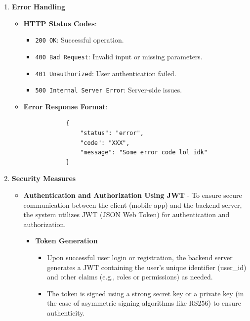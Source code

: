 \documentclass[12pt, titlepage]{article}
\begin{document}
\begin{enumerate}
\begin{itemize}
\begin{itemize}
\begin{verbatim}
				{
					"userId": "12345",
					"budget": {
						"Groceries": 200,
						"Entertainment": 100
					}
				}
			\end{verbatim}
			\item \textbf{Response}:
			\begin{verbatim}
				{
					"status": "success",
					"message": "Budget updated successfully."
				}
			\end{verbatim}
		\end{itemize}
	\end{itemize}
	\item \textbf{Error Handling}
	\begin{itemize}
		\item \textbf{HTTP Status Codes}:
		\begin{itemize}
			\item \texttt{200 OK}: Successful operation.
			\item \texttt{400 Bad Request}: Invalid input or missing parameters.
			\item \texttt{401 Unauthorized}: User authentication failed.
			\item \texttt{500 Internal Server Error}: Server-side issues.
		\end{itemize}
		\item \textbf{Error Response Format}:
		\begin{verbatim}
			{
				"status": "error",
				"code": "XXX",
				"message": "Some error code lol idk"
			}
		\end{verbatim}
	\end{itemize}
	\item \textbf{Security Measures}
	\begin{itemize}
		\item \textbf{Authentication and Authorization Using JWT} - To ensure secure communication between the client (mobile app) and the backend server, the system utilizes JWT (JSON Web Token) for authentication and authorization.
		\begin{itemize}
			\item \textbf{Token Generation}
			\begin{itemize}
				\item Upon successful user login or registration, the backend server generates a JWT containing the user's unique identifier (user\_id) and other claims (e.g., roles or permissions) as needed.
				\item The token is signed using a strong secret key or a private key (in the case of asymmetric signing algorithms like RS256) to ensure authenticity.

\end{itemize}
\end{itemize}
\end{itemize}
\end{enumerate}
\end{document}
